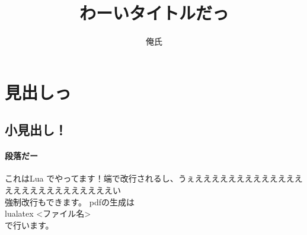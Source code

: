 \documentclass{ltjsarticle}
\begin{document}
\title{わーいタイトルだっ\mathrm{\LaTeX} }
\author{俺氏}
\maketitle
\section{見出しっ}
\subsection{小見出し！}
\paragraph{段落だー}
これはLua\mathrm{\LaTeX} でやってます！端で改行されるし、うぇええええええええええええええええええええええええええい\\
強制改行もできます。
pdfの生成は\\
lualatex <ファイル名>\\
で行います。\\
\end{document}
